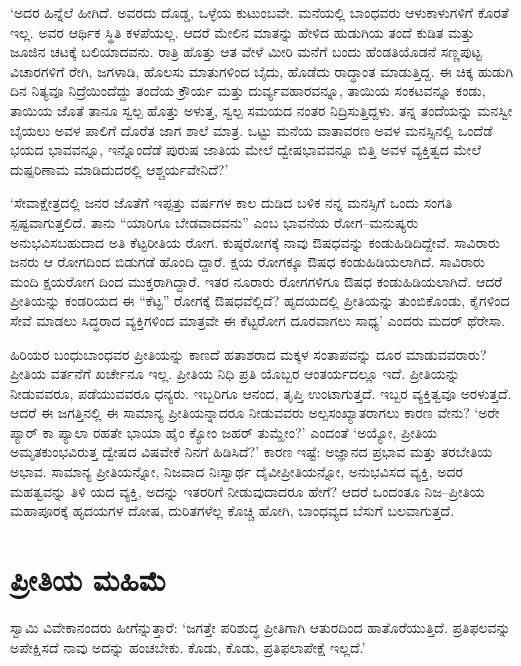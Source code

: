 ‘ಅದರ ಹಿನ್ನೆಲೆ ಹೀಗಿದೆ. ಅವರದು ದೊಡ್ಡ, ಒಳ್ಳೆಯ ಕುಟುಂಬವೇ. ಮನೆಯಲ್ಲಿ ಬಾಂಧವರು ಆಳುಕಾಳುಗಳಿಗೆ ಕೊರತೆ ಇಲ್ಲ. ಅವರ ಆರ್ಥಿಕ ಸ್ಥಿತಿ ಕಳಪೆಯಲ್ಲ. ಆದರೆ ಮೇಲಿನ ಮಾತನ್ನು ಹೇಳಿದ ಹುಡುಗಿಯ ತಂದೆ ಕುಡಿತ ಮತ್ತು ಜೂಜಿನ ಚಟಕ್ಕೆ ಬಲಿಯಾದವನು. ರಾತ್ರಿ ಹೊತ್ತು ಆತ ವೇಳೆ ಮೀರಿ ಮನೆಗೆ ಬಂದು ಹೆಂಡತಿಯೊಡನೆ ಸಣ್ಣಪುಟ್ಟ ವಿಚಾರಗಳಿಗೆ ರೇಗಿ, ಜಗಳಾಡಿ, ಹೊಲಸು ಮಾತುಗಳಿಂದ ಬೈದು, ಹೊಡೆದು ರಾದ್ಧಾಂತ ಮಾಡುತ್ತಿದ್ದ. ಈ ಚಿಕ್ಕ ಹುಡುಗಿ ದಿನ ನಿತ್ಯವೂ ನಿದ್ರೆಯಿಂದೆದ್ದು ತಂದೆಯ ಕ್ರೌರ್ಯ ಮತ್ತು ದುರ್ವ್ಯವಹಾರವನ್ನೂ, ತಾಯಿಯ ಸಂಕಟವನ್ನೂ ಕಂಡು, ತಾಯಿಯ ಜೊತೆ ತಾನೂ ಸ್ವಲ್ಪ ಹೊತ್ತು ಅಳುತ್ತ, ಸ್ವಲ್ಪ ಸಮಯದ ನಂತರ ನಿದ್ರಿಸುತ್ತಿದ್ದಳು. ತನ್ನ ತಂದೆಯನ್ನು ಮನಸ್ವೀ ಬೈಯಲು ಅವಳ ಪಾಲಿಗೆ ದೊರೆತ ಜಾಗ ಶಾಲೆ ಮಾತ್ರ. ಒಟ್ಟು ಮನೆಯ ವಾತಾವರಣ ಅವಳ ಮನಸ್ಸಿನಲ್ಲಿ ಒಂದೆಡೆ ಭಯದ ಭಾವವನ್ನೂ, ಇನ್ನೊಂದೆಡೆ ಪುರುಷ ಜಾತಿಯ ಮೇಲೆ ದ್ವೇಷಭಾವವನ್ನೂ ಬಿತ್ತಿ ಅವಳ ವ್ಯಕ್ತಿತ್ವದ ಮೇಲೆ ದುಷ್ಪರಿಣಾಮ ಮಾಡಿದುದರಲ್ಲಿ ಆಶ್ಚರ್ಯವೇನಿದೆ?’

‘ಸೇವಾಕ್ಷೇತ್ರದಲ್ಲಿ ಜನರ ಜೊತೆಗೆ ಇಪ್ಪತ್ತು ವರ್ಷಗಳ ಕಾಲ ದುಡಿದ ಬಳಿಕ ನನ್ನ ಮನಸ್ಸಿಗೆ ಒಂದು ಸಂಗತಿ ಸ್ಪಷ್ಟವಾಗುತ್ತಲಿದೆ. ತಾನು “ಯಾರಿಗೂ ಬೇಡವಾದವನು” ಎಂಬ ಭಾವನೆಯ ರೋಗ–ಮನುಷ್ಯರು ಅನುಭವಿಸಬಹುದಾದ ಅತಿ ಕೆಟ್ಟರೀತಿಯ ರೋಗ. ಕುಷ್ಠರೋಗಕ್ಕೆ ನಾವು ಔಷಧವನ್ನು ಕಂಡುಹಿಡಿದಿದ್ದೇವೆ. ಸಾವಿರಾರು ಜನರು ಆ ರೋಗದಿಂದ ಬಿಡುಗಡೆ ಹೊಂದಿ ದ್ದಾರೆ. ಕ್ಷಯ ರೋಗಕ್ಕೂ ಔಷಧ ಕಂಡುಹಿಡಿಯಲಾಗಿದೆ. ಸಾವಿರಾರು ಮಂದಿ ಕ್ಷಯರೋಗ ದಿಂದ ಮುಕ್ತರಾಗಿದ್ದಾರೆ. ಇತರ ನೂರಾರು ರೋಗಗಳಿಗೂ ಔಷಧ ಕಂಡುಹಿಡಿಯಲಾಗಿದೆ. ಆದರೆ ಪ್ರೀತಿಯನ್ನು ಕಂಡರಿಯದ ಈ “ಕೆಟ್ಟ” ರೋಗಕ್ಕೆ ಔಷಧವೆಲ್ಲಿದೆ? ಹೃದಯದಲ್ಲಿ ಪ್ರೀತಿಯನ್ನು ತುಂಬಿಕೊಂಡು, ಕೈಗಳಿಂದ ಸೇವೆ ಮಾಡಲು ಸಿದ್ಧರಾದ ವ್ಯಕ್ತಿಗಳಿಂದ ಮಾತ್ರವೇ ಈ ಕೆಟ್ಟರೋಗ ದೂರವಾಗಲು ಸಾಧ್ಯ’ ಎಂದರು ಮದರ್ ಥೆರೇಸಾ.

ಹಿರಿಯರ ಬಂಧುಬಾಂಧವರ ಪ್ರೀತಿಯನ್ನು ಕಾಣದೆ ಹತಾಶರಾದ ಮಕ್ಕಳ ಸಂತಾಪವನ್ನು ದೂರ ಮಾಡುವವರಾರು? ಪ್ರೀತಿಯ ವರ್ತನೆಗೆ ಖರ್ಚೇನೂ ಇಲ್ಲ. ಪ್ರೀತಿಯ ನಿಧಿ ಪ್ರತಿ ಯೊಬ್ಬರ ಆಂತರ್ಯದಲ್ಲೂ ಇದೆ. ಪ್ರೀತಿಯನ್ನು ನೀಡುವವರೂ, ಪಡೆಯುವವರೂ ಧನ್ಯರು. ಇಬ್ಬರಿಗೂ ಆನಂದ, ತೃಪ್ತಿ ಉಂಟಾಗುತ್ತದೆ. ಇಬ್ಬರ ವ್ಯಕ್ತಿತ್ವವೂ ಅರಳುತ್ತದೆ. ಆದರೆ ಈ ಜಗತ್ತಿನಲ್ಲಿ ಈ ಸಾಮಾನ್ಯ ಪ್ರೀತಿಯನ್ನಾದರೂ ನೀಡುವವರು ಅಲ್ಪಸಂಖ್ಯಾತರಾಗಲು ಕಾರಣ ವೇನು? ‘ಅರೇ ಪ್ಯಾರ್ ಕಾ ಪ್ಯಾಲಾ ರಹತೇ ಭಾಯಾ ಹೈಂ ಕ್ಯೋಂ ಜಹರ್ ತುಮ್ಹೇಂ?’ ಎಂದಂತೆ ‘ಅಯ್ಯೋ, ಪ್ರೀತಿಯ ಅಮೃತಕುಂಭವಿರುತ್ತ ದ್ವೇಷದ ವಿಷವೇಕೆ ನಿನಗೆ ಹಿಡಿಸಿದೆ?’ ಕಾರಣ ಇಷ್ಟೆ: ಅಜ್ಞಾನದ ಪ್ರಭಾವ ಮತ್ತು ತರಬೇತಿಯ ಅಭಾವ. ಸಾಮಾನ್ಯ ಪ್ರೀತಿಯನ್ನೋ, ನಿಜವಾದ ನಿಃಸ್ವಾರ್ಥ ದೈವೀಪ್ರೀತಿಯನ್ನೋ, ಅನುಭವಿಸದ ವ್ಯಕ್ತಿ, ಅದರ ಮಹತ್ವವನ್ನು ತಿಳಿ ಯದ ವ್ಯಕ್ತಿ, ಅದನ್ನು ಇತರರಿಗೆ ನೀಡುವುದಾದರೂ ಹೇಗೆ? ಆದರೆ ಒಂದಂತೂ ನಿಜ–ಪ್ರೀತಿಯ ಮಹಾಪೂರಕ್ಕೆ ಹೃದಯಗಳ ದೋಷ, ದುರಿತಗಳೆಲ್ಲ ಕೊಚ್ಚಿ ಹೋಗಿ, ಬಾಂಧವ್ಯದ ಬೆಸುಗೆ ಬಲವಾಗುತ್ತದೆ.


\section{ಪ್ರೀತಿಯ ಮಹಿಮೆ}

ಸ್ವಾಮಿ ವಿವೇಕಾನಂದರು ಹೀಗೆನ್ನುತ್ತಾರೆ: ‘ಜಗತ್ತೇ ಪರಿಶುದ್ಧ ಪ್ರೀತಿಗಾಗಿ ಆತುರದಿಂದ ಹಾತೊರೆಯುತ್ತಿದೆ. ಪ್ರತಿಫಲವನ್ನು ಅಪೇಕ್ಷಿಸದೆ ನಾವು ಅದನ್ನು ಹಂಚಬೇಕು. ಕೊಡು, ಕೊಡು, ಪ್ರತಿಫಲಾಪೇಕ್ಷೆ ಇಲ್ಲದೆ.’

